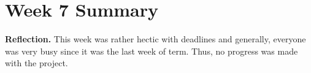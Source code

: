 \documentclass{article}
\begin{document}
\section*{Week 7 Summary}

\vspace{0.5cm}

\textbf{Reflection.}
This week was rather hectic with deadlines and generally, everyone was very busy since it was the last week of term. Thus, no progress was made with the project. 
\end{document}
